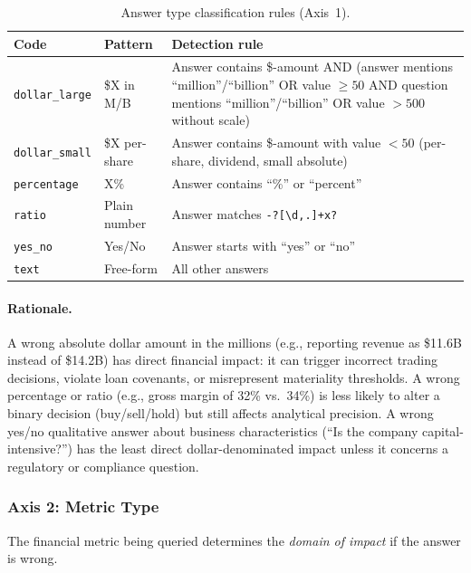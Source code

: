 \begin{table}[h]
\centering
\footnotesize
\begin{tabular}{@{}llp{10cm}@{}}
\toprule
Code & Pattern & Detection rule \\
\midrule
\texttt{dollar\_large}
  & \$X in M/B
  & Answer contains \$-amount AND (answer mentions \enquote{million}/\enquote{billion} OR
    value $\geq 50$ AND question mentions \enquote{million}/\enquote{billion} OR value
    $> 500$ without scale) \\
\texttt{dollar\_small}
  & \$X per-share
  & Answer contains \$-amount with value $< 50$ (per-share, dividend,
    small absolute) \\
\texttt{percentage}
  & X\%
  & Answer contains \enquote{\%} or \enquote{percent} \\
\texttt{ratio}
  & Plain number
  & Answer matches \texttt{-?[\textbackslash d,.]+x?} \\
\texttt{yes\_no}
  & Yes/No
  & Answer starts with \enquote{yes} or \enquote{no} \\
\texttt{text}
  & Free-form
  & All other answers \\
\bottomrule
\end{tabular}
\caption{Answer type classification rules (Axis~1).}
\label{tab:answer-types}
\end{table}

\paragraph{Rationale.}
A wrong absolute dollar amount in the millions (e.g., reporting revenue
as \$11.6B instead of \$14.2B) has direct financial impact: it can
trigger incorrect trading decisions, violate loan covenants, or
misrepresent materiality thresholds. A wrong percentage or ratio
(e.g., gross margin of 32\% vs.\ 34\%) is less likely to alter a
binary decision (buy/sell/hold) but still affects analytical precision.
A wrong yes/no qualitative answer about business characteristics
(\enquote{Is the company capital-intensive?}) has the least direct
dollar-denominated impact unless it concerns a regulatory or
compliance question.

\subsubsection{Axis 2: Metric Type}
\label{sec:metric-type}

The financial metric being queried determines the \emph{domain of
impact} if the answer is wrong.

